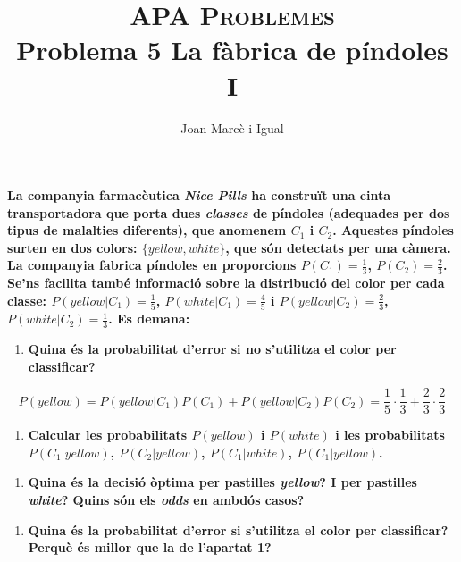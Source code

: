 \documentclass[a4paper]{article}
\title{\textsc{APA Problemes} \\ Problema 5 La fàbrica de píndoles I}
\author{Joan Marcè i Igual}
\date{}
\begin{document}
\maketitle

\textbf{La companyia farmacèutica \emph{Nice Pills} ha construït una cinta transportadora que porta dues \emph{classes} de píndoles (adequades per dos tipus de malalties diferents), que anomenem $C_1$ i $C_2$. Aquestes píndoles surten en dos colors: $\{yellow, white\}$, que són detectats per una càmera. La companyia fabrica píndoles en proporcions $P(C_1) = \frac{1}{3}$, $P(C_2) = \frac{2}{3}$. Se'ns facilita també informació sobre la distribució del color per cada classe: $P(yellow|C_1) = \frac{1}{5}$, $P(white|C_1) = \frac{4}{5}$ i $P(yellow|C_2)=\frac{2}{3}$, $P(white|C_2)=\frac{1}{3}$. Es demana:}


\begin{enumerate}
	\item \textbf{Quina és la probabilitat d'error si no s'utilitza el color per classificar?}
\end{enumerate}
$$
P(yellow) = P(yellow|C_1)P(C_1) + P(yellow|C_2)P(C_2) = 
\frac{1}{5}·\frac{1}{3} + \frac{2}{3}·\frac{2}{3}
$$

\begin{enumerate}[resume]
	\item \textbf{Calcular les probabilitats $P(yellow)$ i $P(white)$ i les probabilitats $P(C_1|yellow)$, $P(C_2|yellow)$, $P(C_1|white)$, $P(C_1|yellow)$.}
\end{enumerate}

\begin{enumerate}[resume]
	\item \textbf{Quina és la decisió òptima per pastilles \emph{yellow}? I per pastilles \emph{white}? Quins són els \emph{odds} en ambdós casos?}
\end{enumerate}

\begin{enumerate}[resume]
	\item \textbf{Quina és la probabilitat d'error si s'utilitza el color per classificar? Perquè és millor que la de l'apartat 1?}
\end{enumerate}
\end{document}
